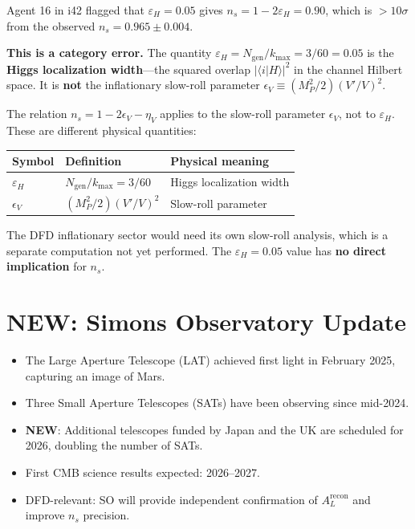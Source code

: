 \documentclass[11pt,a4paper]{article}
\newcommand{\NEW}{\textcolor{dfdblue}{\textbf{NEW}}}
\begin{document}
\begin{tcolorbox}[colback=green!5!white, colframe=green!60!black,
  title={RESOLUTION: $\varepsilon_H$ vs.\ $\epsilon_V$ Confusion}]

Agent 16 in i42 flagged that $\varepsilon_H = 0.05$ gives $n_s = 1 - 2\varepsilon_H = 0.90$, which is $>10\sigma$ from the observed $n_s = 0.965 \pm 0.004$.

\textbf{This is a category error.} The quantity $\varepsilon_H = N_{\text{gen}} / k_{\max} = 3/60 = 0.05$ is the \textbf{Higgs localization width}---the squared overlap $|\langle i | H \rangle|^2$ in the channel Hilbert space. It is \textbf{not} the inflationary slow-roll parameter $\epsilon_V \equiv (M_P^2/2)(V'/V)^2$.

The relation $n_s = 1 - 2\epsilon_V - \eta_V$ applies to the slow-roll parameter $\epsilon_V$, not to $\varepsilon_H$. These are different physical quantities:

\begin{center}
\begin{tabular}{lll}
\toprule
\textbf{Symbol} & \textbf{Definition} & \textbf{Physical meaning} \\
\midrule
$\varepsilon_H$ & $N_{\text{gen}} / k_{\max} = 3/60$ & Higgs localization width \\
$\epsilon_V$ & $(M_P^2/2)(V'/V)^2$ & Slow-roll parameter \\
\bottomrule
\end{tabular}
\end{center}

The DFD inflationary sector would need its own slow-roll analysis, which is a separate computation not yet performed. The $\varepsilon_H = 0.05$ value has \textbf{no direct implication} for $n_s$.
\end{tcolorbox}

\section{\NEW: Simons Observatory Update}

\begin{itemize}
\item The Large Aperture Telescope (LAT) achieved first light in February 2025, capturing an image of Mars.
\item Three Small Aperture Telescopes (SATs) have been observing since mid-2024.
\item \NEW: Additional telescopes funded by Japan and the UK are scheduled for 2026, doubling the number of SATs.
\item First CMB science results expected: 2026--2027.
\item DFD-relevant: SO will provide independent confirmation of $A_L^{\text{recon}}$ and improve $n_s$ precision.
\end{itemize}
\end{document}
